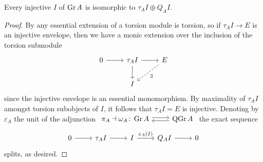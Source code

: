 \documentclass[dissertation.tex]{subfiles}
\begin{document}
\begin{lemma} \label{lemma: Gr injectives}
  Every injective \(I\) of \(\operatorname{Gr}A\) is isomorphic to \(\tau_A I \oplus Q_A I\).

\end{lemma}

\begin{proof}
  By \cite[Prop 2.2]{AZ} any essential extension of a torsion module is torsion, so if \(\tau_{A} I \to E\) is an injective envelope, then we have a monic extension over the inclusion of the torsion submodule
  \[\begin{tikzcd}
  0 \arrow{r} & \tau_{A} I \arrow{r}\arrow{d} & E \arrow[dashed]{ld}{\exists}\\
  & I
  \end{tikzcd}\]  since the injective envelope is an essential monomorphism.
  By maximality of \(\tau_{A} I\) amongst torsion subobjects of \(I\), it follows that \(\tau_{A} I = E\) is injective.
  Denoting by \(\varepsilon_A\) the unit of the adjunction
  \(\begin{tikzcd}
  \pi_A \dashv \omega_A \colon \Gr{A} \arrow[shift left=.5ex]{r} & \QGr{A} \arrow[shift left=.5ex]{l}
  \end{tikzcd}\)
  the exact sequence
  \[\begin{tikzcd}
  0 \arrow{r} & \tau_{A} I \arrow{r} & I \arrow{r}{\varepsilon_A(I)} & Q_{A} I \arrow{r} & 0
  \end{tikzcd}\]  splits, as desired.
\end{proof}
\end{document}
